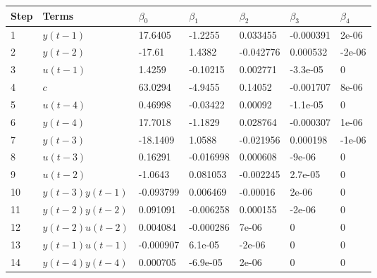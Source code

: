 \begin{tabular}{lllllll}
Step & Terms & $\beta_{0}$ & $\beta_{1}$ & $\beta_{2}$ & $\beta_{3}$ & $\beta_{4}$ \\ 
\hline 
1 & $y(t-1)$ & 17.6405 & -1.2255 & 0.033455 & -0.000391 & 2e-06 \\ 
2 & $y(t-2)$ & -17.61 & 1.4382 & -0.042776 & 0.000532 & -2e-06 \\ 
3 & $u(t-1)$ & 1.4259 & -0.10215 & 0.002771 & -3.3e-05 & 0 \\ 
4 & $c$ & 63.0294 & -4.9455 & 0.14052 & -0.001707 & 8e-06 \\ 
5 & $u(t-4)$ & 0.46998 & -0.03422 & 0.00092 & -1.1e-05 & 0 \\ 
6 & $y(t-4)$ & 17.7018 & -1.1829 & 0.028764 & -0.000307 & 1e-06 \\ 
7 & $y(t-3)$ & -18.1409 & 1.0588 & -0.021956 & 0.000198 & -1e-06 \\ 
8 & $u(t-3)$ & 0.16291 & -0.016998 & 0.000608 & -9e-06 & 0 \\ 
9 & $u(t-2)$ & -1.0643 & 0.081053 & -0.002245 & 2.7e-05 & 0 \\ 
10 & $y(t-3)y(t-1)$ & -0.093799 & 0.006469 & -0.00016 & 2e-06 & 0 \\ 
11 & $y(t-2)y(t-2)$ & 0.091091 & -0.006258 & 0.000155 & -2e-06 & 0 \\ 
12 & $y(t-2)u(t-2)$ & 0.004084 & -0.000286 & 7e-06 & 0 & 0 \\ 
13 & $y(t-1)u(t-1)$ & -0.000907 & 6.1e-05 & -2e-06 & 0 & 0 \\ 
14 & $y(t-4)y(t-4)$ & 0.000705 & -6.9e-05 & 2e-06 & 0 & 0 \\ 
\hline 
\end{tabular}